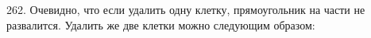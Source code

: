 262. Очевидно, что если удалить одну клетку, прямоугольник на части не развалится. Удалить же две клетки можно следующим образом:
\begin{center}
\begin{figure}[ht!]
\end{figure}
\end{center}
\newpage\noindent
